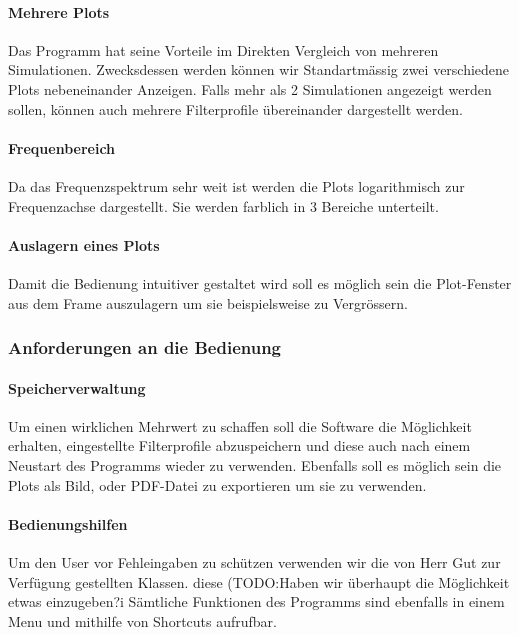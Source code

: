 \paragraph{Mehrere Plots}\label{para:mehrereplots}
		Das Programm hat seine Vorteile im Direkten Vergleich von mehreren Simulationen. Zwecksdessen werden können wir Standartmässig zwei verschiedene Plots nebeneinander Anzeigen. Falls mehr als 2 Simulationen angezeigt 		werden sollen, können auch mehrere Filterprofile übereinander dargestellt werden. 
\bigskip
\paragraph{Frequenbereich}\label{para:frequenzbereich}
		Da das Frequenzspektrum sehr weit ist werden die Plots logarithmisch zur Frequenzachse dargestellt. Sie werden farblich in 3 Bereiche unterteilt.
\bigskip
\paragraph{Auslagern eines Plots}\label{para:auslagerneinesplots}
Damit die Bedienung intuitiver gestaltet wird soll es möglich sein die Plot-Fenster aus dem Frame auszulagern um sie beispielsweise zu Vergrössern. 
		

\subsubsection{Anforderungen an die Bedienung} \label{subsubsec:bedienungsanforderungen}

\bigskip
{}
\paragraph{Speicherverwaltung}  \label{para:speicherverwaltung}
Um einen wirklichen Mehrwert zu schaffen soll die Software die Möglichkeit erhalten, eingestellte Filterprofile abzuspeichern und diese auch nach einem Neustart des Programms wieder zu verwenden. 
		Ebenfalls soll es möglich sein die Plots als Bild, oder PDF-Datei zu exportieren um sie zu verwenden.
\bigskip
\paragraph{Bedienungshilfen}\label{para:bedienungshilfen}
		Um den User vor Fehleingaben zu schützen verwenden wir die von Herr Gut zur Verfügung gestellten Klassen. diese (TODO:Haben wir überhaupt die Möglichkeit etwas einzugeben?^^)
		Sämtliche Funktionen des Programms sind ebenfalls in einem Menu und mithilfe von Shortcuts aufrufbar.

